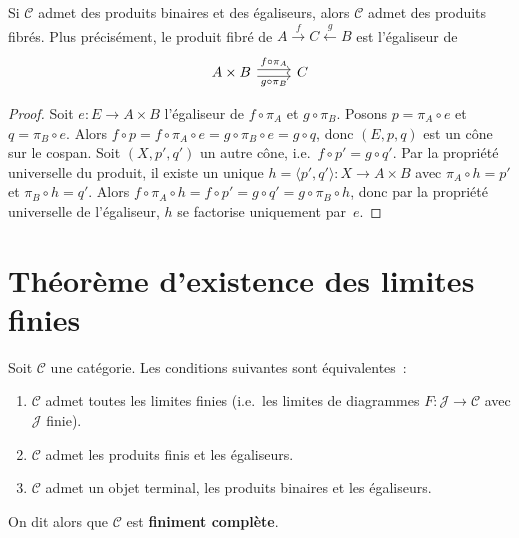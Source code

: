 \begin{proposition}\label{prop:pullback-egaliseur-produit}
Si $\mathcal{C}$ admet des produits binaires et des égaliseurs, alors
$\mathcal{C}$ admet des produits fibrés. Plus précisément, le produit fibré
de $A\xrightarrow{f}C\xleftarrow{g}B$ est l'égaliseur de
\[
\begin{tikzcd}
A\times B \arrow[r, shift left, "f\circ\pi_A"] \arrow[r, shift right, "g\circ\pi_B"'] & C
\end{tikzcd}
\]
\end{proposition}

\begin{proof}
Soit $e\colon E\to A\times B$ l'égaliseur de $f\circ\pi_A$ et $g\circ\pi_B$.
Posons $p=\pi_A\circ e$ et $q=\pi_B\circ e$.
Alors $f\circ p = f\circ\pi_A\circ e = g\circ\pi_B\circ e = g\circ q$,
donc $(E,p,q)$ est un cône sur le cospan.
Soit $(X,p',q')$ un autre cône, i.e.\ $f\circ p'=g\circ q'$.
Par la propriété universelle du produit, il existe un unique
$h=\langle p',q'\rangle\colon X\to A\times B$ avec
$\pi_A\circ h=p'$ et $\pi_B\circ h=q'$.
Alors $f\circ\pi_A\circ h = f\circ p' = g\circ q' = g\circ\pi_B\circ h$,
donc par la propriété universelle de l'égaliseur, $h$ se factorise
uniquement par~$e$.
\end{proof}


\section{Théorème d'existence des limites finies}\label{sec:existence-limites}

\begin{theoreme}\label{thm:existence-limites-finies}
Soit $\mathcal{C}$ une catégorie.
Les conditions suivantes sont équivalentes~:
\begin{enumerate}[label=(\roman*)]
\item $\mathcal{C}$ admet toutes les limites finies (i.e.\ les limites
      de diagrammes $F\colon\mathcal{J}\to\mathcal{C}$ avec $\mathcal{J}$ finie).
\item $\mathcal{C}$ admet les produits finis et les égaliseurs.
\item $\mathcal{C}$ admet un objet terminal, les produits binaires et
      les égaliseurs.
\end{enumerate}
On dit alors que $\mathcal{C}$ est \textbf{finiment complète}.
\end{theoreme}

